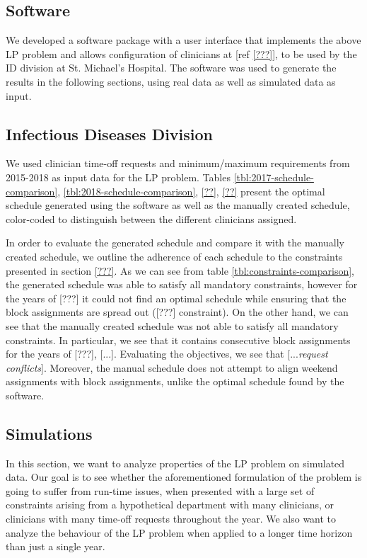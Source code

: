 \subsection{Software}
We developed a software package with a user interface that implements the above LP problem and allows configuration of clinicians at [ref \ref{???}], to be used by the ID division at St. Michael's Hospital. The software was used to generate the results in the following sections, using real data as well as simulated data as input.

\subsection{Infectious Diseases Division}
We used clinician time-off requests and minimum/maximum requirements from 2015-2018 as input data for the LP problem. Tables \ref{tbl:2017-schedule-comparison}, \ref{tbl:2018-schedule-comparison}, \ref{??}, \ref{??} present the optimal schedule generated using the software as well as the manually created schedule, color-coded to distinguish between the different clinicians assigned.




In order to evaluate the generated schedule and compare it with the manually created schedule, we outline the adherence of each schedule to the constraints presented in section \ref{???}. As we can see from table \ref{tbl:constraints-comparison}, the generated schedule was able to satisfy all mandatory constraints, however for the years of [???] it could not find an optimal schedule while ensuring that the block assignments are spread out ([???] constraint). On the other hand, we can see that the manually created schedule was not able to satisfy all mandatory constraints. In particular, we see that it contains consecutive block assignments for the years of [???], [...]. Evaluating the objectives, we see that [...\textit{request conflicts}]. Moreover, the manual schedule does not attempt to align weekend assignments with block assignments, unlike the optimal schedule found by the software.



\subsection{Simulations}
In this section, we want to analyze properties of the LP problem on simulated data. Our goal is to see whether the aforementioned formulation of the problem is going to suffer from run-time issues, when presented with a large set of constraints arising from a hypothetical department with many clinicians, or clinicians with many time-off requests throughout the year. We also want to analyze the behaviour of the LP problem when applied to a longer time horizon than just a single year.